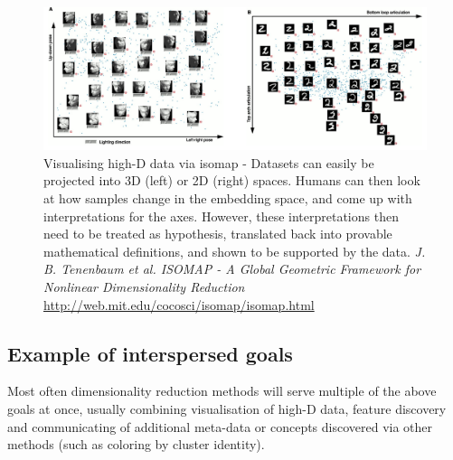 \documentclass[11pt]{article}
\begin{document}
\begin{figure}[h!]
\hspace{-2cm}\includegraphics[width=1.3\linewidth]{isomap-head-digit-embeddings-2}

\caption{Visualising high-D data via isomap - Datasets can easily be projected into 3D (left) or 2D (right) spaces. Humans can then look at how samples change in the embedding space, and come up with interpretations for the axes. However, these interpretations then need to be treated as hypothesis, translated back into provable mathematical definitions, and shown to be supported by the data. \emph{J. B. Tenenbaum et al. ISOMAP - A Global Geometric Framework for Nonlinear Dimensionality Reduction} \url{http://web.mit.edu/cocosci/isomap/isomap.html}}
\end{figure} 

\clearpage

\subsection{Example of interspersed goals}

Most often dimensionality reduction methods will serve multiple of the above goals at once, usually combining visualisation of high-D data, feature discovery and communicating of additional meta-data or concepts discovered via other methods (such as coloring by cluster identity).
\end{document}
